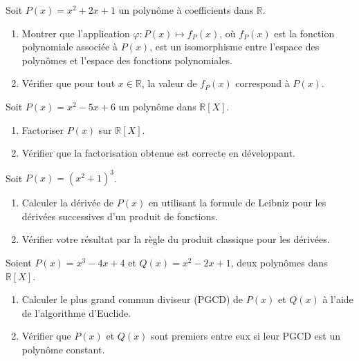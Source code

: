 \begin{exercice}
Soit \( P(x) = x^2 + 2x + 1 \) un polynôme à coefficients dans \( \mathbb{R} \).
\begin{enumerate}
    \item Montrer que l’application \( \varphi : P(x) \mapsto f_P(x) \), où \( f_P(x) \) est la fonction polynomiale associée à \( P(x) \), est un isomorphisme entre l’espace des polynômes et l’espace des fonctions polynomiales.
    \item Vérifier que pour tout \( x \in \mathbb{R} \), la valeur de \( f_P(x) \) correspond à \( P(x) \).
\end{enumerate}
\end{exercice}

\begin{exercice}[Factorisation]
Soit \( P(x) = x^2 - 5x + 6 \) un polynôme dans \( \mathbb{R}[X] \).
\begin{enumerate}
    \item Factoriser \( P(x) \) sur \( \mathbb{R}[X] \).
    \item Vérifier que la factorisation obtenue est correcte en développant.
\end{enumerate}
\end{exercice}

\begin{exercice}
Soit \( P(x) = (x^2 + 1)^3 \).
\begin{enumerate}
    \item Calculer la dérivée de \( P(x) \) en utilisant la formule de Leibniz pour les dérivées successives d’un produit de fonctions.
    \item Vérifier votre résultat par la règle du produit classique pour les dérivées.
\end{enumerate}
\end{exercice}

\begin{exercice}[Arithmétique] 
Soient \( P(x) = x^3 - 4x + 4 \) et \( Q(x) = x^2 - 2x + 1 \), deux polynômes dans \( \mathbb{R}[X] \).
\begin{enumerate}
    \item Calculer le plus grand commun diviseur (PGCD) de \( P(x) \) et \( Q(x) \) à l’aide de l’algorithme d’Euclide.
    \item Vérifier que \( P(x) \) et \( Q(x) \) sont premiers entre eux si leur PGCD est un polynôme constant.
\end{enumerate}
\end{exercice}

